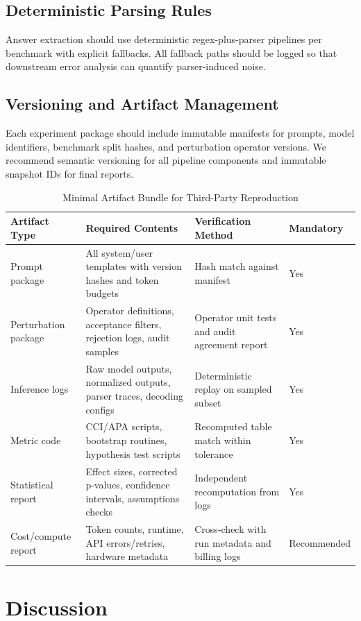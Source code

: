 \documentclass[conference]{IEEEtran}
\begin{document}
\subsection{Deterministic Parsing Rules}
Answer extraction should use deterministic regex-plus-parser pipelines per benchmark with explicit fallbacks. All fallback paths should be logged so that downstream error analysis can quantify parser-induced noise.

\subsection{Versioning and Artifact Management}
Each experiment package should include immutable manifests for prompts, model identifiers, benchmark split hashes, and perturbation operator versions. We recommend semantic versioning for all pipeline components and immutable snapshot IDs for final reports.

\begin{table}[!t]
\caption{Minimal Artifact Bundle for Third-Party Reproduction}
\label{tab:artifact-bundle}
\centering
\begin{tabular}{p{2.4cm}p{5.0cm}p{5.2cm}p{1.8cm}}
\toprule
Artifact Type & Required Contents & Verification Method & Mandatory \\
\midrule
Prompt package & All system/user templates with version hashes and token budgets & Hash match against manifest & Yes \\
Perturbation package & Operator definitions, acceptance filters, rejection logs, audit samples & Operator unit tests and audit agreement report & Yes \\
Inference logs & Raw model outputs, normalized outputs, parser traces, decoding configs & Deterministic replay on sampled subset & Yes \\
Metric code & CCI/APA scripts, bootstrap routines, hypothesis test scripts & Recomputed table match within tolerance & Yes \\
Statistical report & Effect sizes, corrected p-values, confidence intervals, assumptions checks & Independent recomputation from logs & Yes \\
Cost/compute report & Token counts, runtime, API errors/retries, hardware metadata & Cross-check with run metadata and billing logs & Recommended \\
\bottomrule
\end{tabular}
\end{table}

\section{Discussion}
\end{document}
